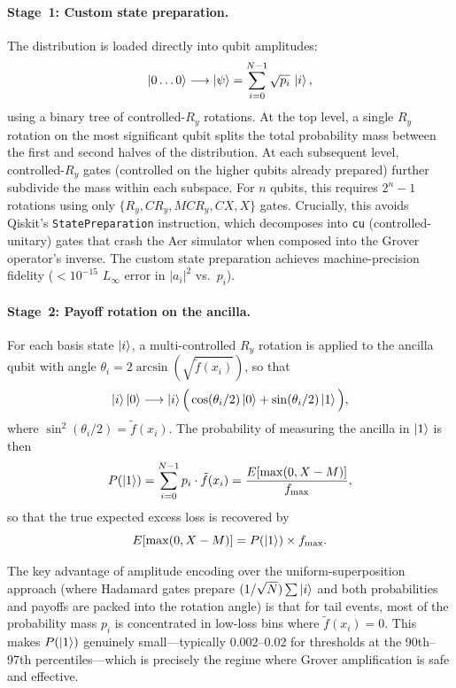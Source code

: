 \documentclass[11pt,a4paper]{article}
\begin{document}
\paragraph{Stage~1: Custom state preparation.} The distribution is loaded directly into qubit amplitudes:
\begin{equation}
\ket{0\ldots 0} \longrightarrow \ket{\psi} = \sum_{i=0}^{N-1} \sqrt{p_i}\,\ket{i},
\label{eq:state_prep}
\end{equation}
using a binary tree of controlled-$R_y$ rotations. At the top level, a single $R_y$ rotation on the most significant qubit splits the total probability mass between the first and second halves of the distribution. At each subsequent level, controlled-$R_y$ gates (controlled on the higher qubits already prepared) further subdivide the mass within each subspace. For $n$ qubits, this requires $2^n - 1$ rotations using only $\{R_y, CR_y, MCR_y, CX, X\}$ gates. Crucially, this avoids Qiskit's \texttt{StatePreparation} instruction, which decomposes into \texttt{cu} (controlled-unitary) gates that crash the Aer simulator when composed into the Grover operator's inverse. The custom state preparation achieves machine-precision fidelity ($< 10^{-15}$ $L_\infty$ error in $|a_i|^2$ vs.\ $p_i$).

\paragraph{Stage~2: Payoff rotation on the ancilla.} For each basis state $\ket{i}$, a multi-controlled $R_y$ rotation is applied to the ancilla qubit with angle $\theta_i = 2\arcsin(\sqrt{\tilde{f}(x_i)})$, so that
\begin{equation}
\ket{i}\ket{0} \longrightarrow \ket{i}\Big(\cos(\theta_i/2)\ket{0} + \sin(\theta_i/2)\ket{1}\Big),
\label{eq:payoff_rotation}
\end{equation}
where $\sin^2(\theta_i/2) = \tilde{f}(x_i)$. The probability of measuring the ancilla in $\ket{1}$ is then
\begin{equation}
P(\ket{1}) = \sum_{i=0}^{N-1} p_i \cdot \tilde{f}(x_i) = \frac{E[\max(0, X - M)]}{f_{\max}},
\label{eq:readout_prob}
\end{equation}
so that the true expected excess loss is recovered by
\begin{equation}
E[\max(0, X - M)] = P(\ket{1}) \times f_{\max}.
\label{eq:recovery}
\end{equation}

The key advantage of amplitude encoding over the uniform-superposition approach (where Hadamard gates prepare $(1/\sqrt{N})\sum\ket{i}$ and both probabilities and payoffs are packed into the rotation angle) is that for tail events, most of the probability mass $p_i$ is concentrated in low-loss bins where $\tilde{f}(x_i) = 0$. This makes $P(\ket{1})$ genuinely small---typically 0.002--0.02 for thresholds at the 90th--97th percentiles---which is precisely the regime where Grover amplification is safe and effective.
\end{document}
